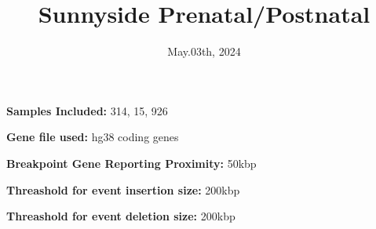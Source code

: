 \documentclass[12pt]{article}
\begin{document}
\title{Sunnyside Prenatal/Postnatal}
\date{May.03th, 2024}
\maketitle

\textbf{{Samples Included: }} 314, 15, 926

\hfill

\textbf{Gene file used: } hg38 coding genes

\hfill

\textbf{Breakpoint Gene Reporting Proximity: } 50kbp

\textbf{Threashold for event insertion size: } 200kbp

\textbf{Threashold for event deletion size: } 200kbp

\newpage
\end{document}
